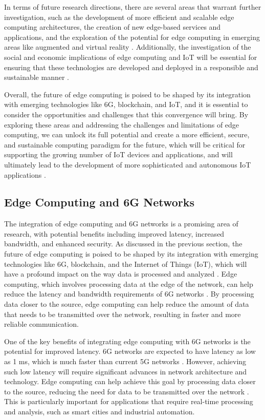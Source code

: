 \documentclass[11pt]{article}
\begin{document}
In terms of future research directions, there are several areas that warrant further investigation, such as the development of more efficient and scalable edge computing architectures, the creation of new edge-based services and applications, and the exploration of the potential for edge computing in emerging areas like augmented and virtual reality \cite{ref26}. Additionally, the investigation of the social and economic implications of edge computing and IoT will be essential for ensuring that these technologies are developed and deployed in a responsible and sustainable manner \cite{ref27}.

Overall, the future of edge computing is poised to be shaped by its integration with emerging technologies like 6G, blockchain, and IoT, and it is essential to consider the opportunities and challenges that this convergence will bring. By exploring these areas and addressing the challenges and limitations of edge computing, we can unlock its full potential and create a more efficient, secure, and sustainable computing paradigm for the future, which will be critical for supporting the growing number of IoT devices and applications, and will ultimately lead to the development of more sophisticated and autonomous IoT applications \cite{ref2}.

\subsection{Edge Computing and 6G Networks}

The integration of edge computing and 6G networks is a promising area of research, with potential benefits including improved latency, increased bandwidth, and enhanced security. As discussed in the previous section, the future of edge computing is poised to be shaped by its integration with emerging technologies like 6G, blockchain, and the Internet of Things (IoT), which will have a profound impact on the way data is processed and analyzed \cite{ref135}. Edge computing, which involves processing data at the edge of the network, can help reduce the latency and bandwidth requirements of 6G networks \cite{ref136}. By processing data closer to the source, edge computing can help reduce the amount of data that needs to be transmitted over the network, resulting in faster and more reliable communication.

One of the key benefits of integrating edge computing with 6G networks is the potential for improved latency. 6G networks are expected to have latency as low as 1 ms, which is much faster than current 5G networks \cite{ref135}. However, achieving such low latency will require significant advances in network architecture and technology. Edge computing can help achieve this goal by processing data closer to the source, reducing the need for data to be transmitted over the network \cite{ref140}. This is particularly important for applications that require real-time processing and analysis, such as smart cities and industrial automation.
\end{document}
